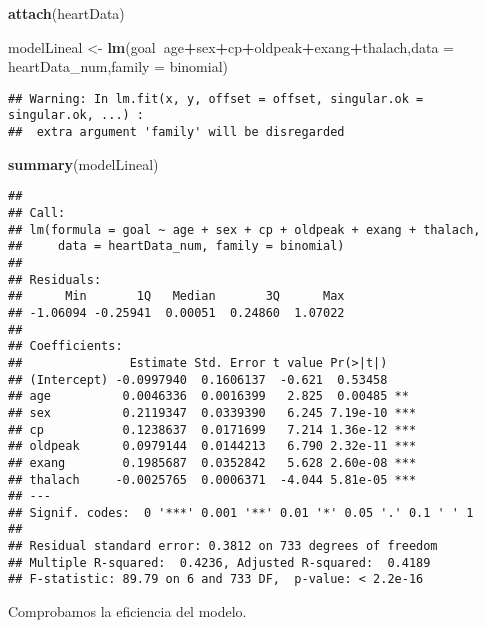 \documentclass[
]{article}
\newenvironment{Shaded}{\begin{snugshade}}{\end{snugshade}}
\newcommand{\DataTypeTok}[1]{\textcolor[rgb]{0.13,0.29,0.53}{#1}}
\newcommand{\KeywordTok}[1]{\textcolor[rgb]{0.13,0.29,0.53}{\textbf{#1}}}
\newcommand{\NormalTok}[1]{#1}
\newcommand{\OperatorTok}[1]{\textcolor[rgb]{0.81,0.36,0.00}{\textbf{#1}}}
\newcommand{\StringTok}[1]{\textcolor[rgb]{0.31,0.60,0.02}{#1}}
\begin{document}
\begin{Shaded}
\begin{Highlighting}[]
\KeywordTok{attach}\NormalTok{(heartData)}

\NormalTok{modelLineal <-}\StringTok{ }\KeywordTok{lm}\NormalTok{(goal}\OperatorTok{~}\NormalTok{age}\OperatorTok{+}\NormalTok{sex}\OperatorTok{+}\NormalTok{cp}\OperatorTok{+}\NormalTok{oldpeak}\OperatorTok{+}\NormalTok{exang}\OperatorTok{+}\NormalTok{thalach,}\DataTypeTok{data =}\NormalTok{ heartData_num,}\DataTypeTok{family =}\NormalTok{ binomial)}
\end{Highlighting}
\end{Shaded}

\begin{verbatim}
## Warning: In lm.fit(x, y, offset = offset, singular.ok = singular.ok, ...) :
##  extra argument 'family' will be disregarded
\end{verbatim}

\begin{Shaded}
\begin{Highlighting}[]
\KeywordTok{summary}\NormalTok{(modelLineal)}
\end{Highlighting}
\end{Shaded}

\begin{verbatim}
## 
## Call:
## lm(formula = goal ~ age + sex + cp + oldpeak + exang + thalach, 
##     data = heartData_num, family = binomial)
## 
## Residuals:
##      Min       1Q   Median       3Q      Max 
## -1.06094 -0.25941  0.00051  0.24860  1.07022 
## 
## Coefficients:
##               Estimate Std. Error t value Pr(>|t|)    
## (Intercept) -0.0997940  0.1606137  -0.621  0.53458    
## age          0.0046336  0.0016399   2.825  0.00485 ** 
## sex          0.2119347  0.0339390   6.245 7.19e-10 ***
## cp           0.1238637  0.0171699   7.214 1.36e-12 ***
## oldpeak      0.0979144  0.0144213   6.790 2.32e-11 ***
## exang        0.1985687  0.0352842   5.628 2.60e-08 ***
## thalach     -0.0025765  0.0006371  -4.044 5.81e-05 ***
## ---
## Signif. codes:  0 '***' 0.001 '**' 0.01 '*' 0.05 '.' 0.1 ' ' 1
## 
## Residual standard error: 0.3812 on 733 degrees of freedom
## Multiple R-squared:  0.4236, Adjusted R-squared:  0.4189 
## F-statistic: 89.79 on 6 and 733 DF,  p-value: < 2.2e-16
\end{verbatim}

Comprobamos la eficiencia del modelo.
\end{document}

